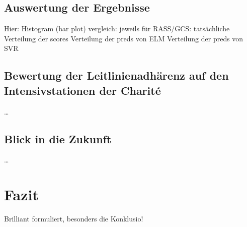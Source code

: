 \section{Auswertung der Ergebnisse}
Hier: Histogram (bar plot) vergleich: jeweils für RASS/GCS:
tatsächliche Verteilung der scores
Verteilung der preds von ELM
Verteilung der preds von SVR

\section{Bewertung der Leitlinienadhärenz auf den Intensivstationen der Charité}
\dots

\section{Blick in die Zukunft}
\dots

\chapter{Fazit}
Brilliant formuliert, besonders die Konklusio!


